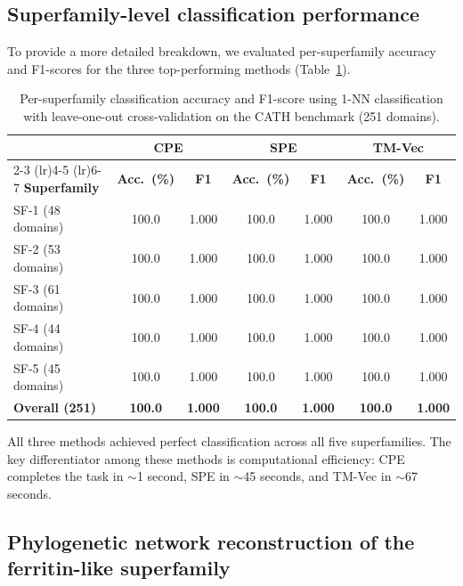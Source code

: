 \documentclass[11pt]{article}
\begin{document}
\subsection{Superfamily-level classification performance}

To provide a more detailed breakdown, we evaluated per-superfamily accuracy and F1-scores for the three top-performing methods (Table~\ref{tab:superfamily}).

\begin{table}[H]
\centering
\caption{Per-superfamily classification accuracy and F1-score using 1-NN classification with leave-one-out cross-validation on the CATH benchmark (251 domains).}
\label{tab:superfamily}
\begin{tabular}{lcccccc}
\toprule
& \multicolumn{2}{c}{\textbf{CPE}} & \multicolumn{2}{c}{\textbf{SPE}} & \multicolumn{2}{c}{\textbf{TM-Vec}} \\
\cmidrule(lr){2-3} \cmidrule(lr){4-5} \cmidrule(lr){6-7}
\textbf{Superfamily} & \textbf{Acc.\ (\%)} & \textbf{F1} & \textbf{Acc.\ (\%)} & \textbf{F1} & \textbf{Acc.\ (\%)} & \textbf{F1} \\
\midrule
SF-1 (48 domains) & 100.0 & 1.000 & 100.0 & 1.000 & 100.0 & 1.000 \\
SF-2 (53 domains) & 100.0 & 1.000 & 100.0 & 1.000 & 100.0 & 1.000 \\
SF-3 (61 domains) & 100.0 & 1.000 & 100.0 & 1.000 & 100.0 & 1.000 \\
SF-4 (44 domains) & 100.0 & 1.000 & 100.0 & 1.000 & 100.0 & 1.000 \\
SF-5 (45 domains) & 100.0 & 1.000 & 100.0 & 1.000 & 100.0 & 1.000 \\
\midrule
\textbf{Overall (251)} & \textbf{100.0} & \textbf{1.000} & \textbf{100.0} & \textbf{1.000} & \textbf{100.0} & \textbf{1.000} \\
\bottomrule
\end{tabular}
\end{table}

All three methods achieved perfect classification across all five superfamilies. The key differentiator among these methods is computational efficiency: CPE completes the task in $\sim$1 second, SPE in $\sim$45 seconds, and TM-Vec in $\sim$67 seconds.

\subsection{Phylogenetic network reconstruction of the ferritin-like superfamily}
\end{document}
